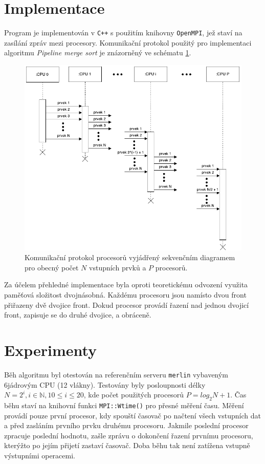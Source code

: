 \documentclass[12pt,a4paper,titlepage,final]{article}
\begin{document}
\section{Implementace}
Program je implementován v \texttt{C++} s použitím knihovny \texttt{OpenMPI}, jež staví na zasílání zpráv mezi procesory. Komunikační protokol použitý pro implementaci algoritmu \textit{Pipeline merge sort} je znázorněný ve schématu \ref{fig:SequenceDiagram}. 

\begin{figure}[!hbt]
	\centering
	\includegraphics[width=1.0\linewidth]{img/sequence_diagram.pdf}
	\caption{Komunikační protokol procesorů vyjádřený sekvenčním diagramem pro obecný počet $N$ vstupních prvků a $P$ procesorů.}
	\label{fig:SequenceDiagram}
\end{figure}

Za účelem přehledné implementace byla oproti teoretickému odvození využita paměťová složitost dvojnásobná. Každému procesoru jsou namísto dvou front přiřazeny dvě dvojice front. Dokud procesor provádí řazení nad jednou dvojicí front, zapisuje se do druhé dvojice, a obráceně.

\section{Experimenty}
Běh algoritmu byl otestován na referenčním serveru \texttt{merlin} vybaveným 6jádrovým CPU (12 vlákny). Testovány byly posloupnosti délky $N = 2^i, i \in \mathbb{N}, 10 \leq i \leq 20$, kde počet použitých procesorů $P = log_2{N} + 1$. Čas běhu staví na knihovní funkci \texttt{MPI::Wtime()} pro přesné měření času. Měření provádí pouze první procesor, kdy spouští časovač po načtení všech vstupních dat a před zasláním prvního prvku druhému procesoru. Jakmile poslední procesor zpracuje poslední hodnotu, zašle zprávu o dokončení řazení prvnímu procesoru, kterýžto po jejím přijetí zastaví časovač. Doba běhu tak není zatížena vstupně výstupními operacemi.
\end{document}
